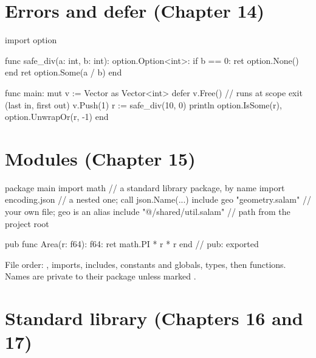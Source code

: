 \section*{Errors and defer (Chapter 14)}

\begin{salamen}
import option

func safe_div(a: int, b: int): option.Option<int>:
    if b == 0: ret option.None() end
    ret option.Some(a / b)
end

func main:
    mut v := Vector {} as Vector<int>
    defer v.Free()                   // runs at scope exit (last in, first out)
    v.Push(1)
    r := safe_div(10, 0)
    println option.IsSome(r), option.UnwrapOr(r, -1)
end
\end{salamen}

\section*{Modules (Chapter 15)}

\begin{shell}
package main
import math                         // a standard library package, by name
import encoding.json                // a nested one; call json.Name(...)
include geo "geometry.salam"        // your own file; geo is an alias
include "@/shared/util.salam"       // path from the project root

pub func Area(r: f64): f64: ret math.PI * r * r end   // pub: exported
\end{shell}

\noindent File order: , imports, includes, constants and globals,
types, then functions. Names are private to their package unless marked
.

\section*{Standard library (Chapters 16 and 17)}

